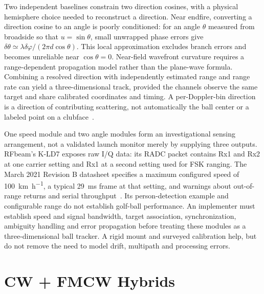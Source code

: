Two independent baselines constrain two direction cosines, with a physical hemisphere choice needed to reconstruct a direction.
Near endfire, converting a direction cosine to an angle is poorly conditioned: for an angle $\theta$ measured from broadside so that $u=\sin\theta$, small unwrapped phase errors give $\delta\theta\simeq\lambda\delta\varphi/(2\pi d\cos\theta)$.
This local approximation excludes branch errors and becomes unreliable near $\cos\theta=0$.
Near-field wavefront curvature requires a range-dependent propagation model rather than the plane-wave formula.
Combining a resolved direction with independently estimated range and range rate can yield a three-dimensional track, provided the channels observe the same target and share calibrated coordinates and timing.
A per-Doppler-bin direction is a direction of contributing scattering, not automatically the ball center or a labeled point on a clubface~\cite{us10850179}.

\begin{implication}
One speed module and two angle modules form an investigational sensing arrangement, not a validated launch monitor merely by supplying three outputs.
RFbeam's K-LD7 exposes raw I/Q data: its RADC packet contains Rx1 and Rx2 at one carrier setting and Rx1 at a second setting used for FSK ranging.
The March 2021 Revision B datasheet specifies a maximum configured speed of \SI{100}{\kilo\meter\per\hour}, a typical \SI{29}{\milli\second} frame at that setting, and warnings about out-of-range returns and serial throughput~\cite{kld7}.
Its person-detection example and configurable range do not establish golf-ball performance.
An implementer must establish speed and signal bandwidth, target association, synchronization, ambiguity handling and error propagation before treating these modules as a three-dimensional ball tracker.
A rigid mount and surveyed calibration help, but do not remove the need to model drift, multipath and processing errors.
\end{implication}

\section{CW + FMCW Hybrids}
\label{sec:fmcw}

